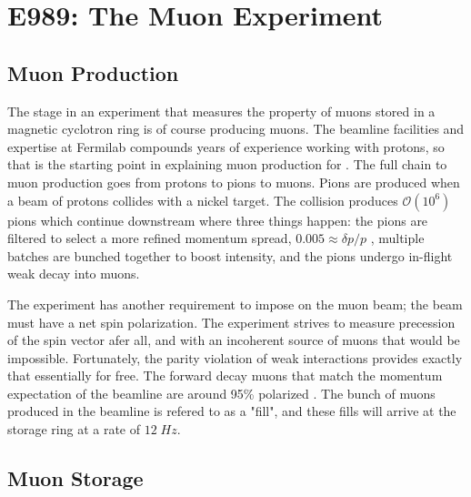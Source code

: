 \chapter {E989: The Muon \gmtwo Experiment}

\section{Muon Production}

The stage in an experiment that measures the property of muons stored in a magnetic cyclotron ring is of course producing muons.  The beamline facilities and expertise at Fermilab compounds years of experience working with protons, so that is the starting point in explaining muon production for \gmtwo.  The full chain to muon production goes from protons to pions to muons.  Pions are produced when a beam of  protons collides with a nickel target.  The collision produces $\mathcal{O}(10^6)$ pions which continue downstream where three things happen: the pions are filtered to select a more refined momentum spread, $0.005\approx\delta p / p$ , multiple batches are bunched together to boost intensity, and the pions undergo in-flight weak decay into muons.


The experiment has another requirement to impose on the muon beam; the beam must have a net spin polarization.  The experiment strives to measure precession of the spin vector afer all, and with an incoherent source of muons that would be impossible.  Fortunately, the parity violation of weak interactions provides exactly that essentially for free.  The forward decay muons that match the momentum expectation of the beamline are around 95\% polarized .  The bunch of muons produced in the beamline is refered to as a "fill", and these fills will arrive at the storage ring at a rate of $12\;Hz$.


\section{Muon Storage}

